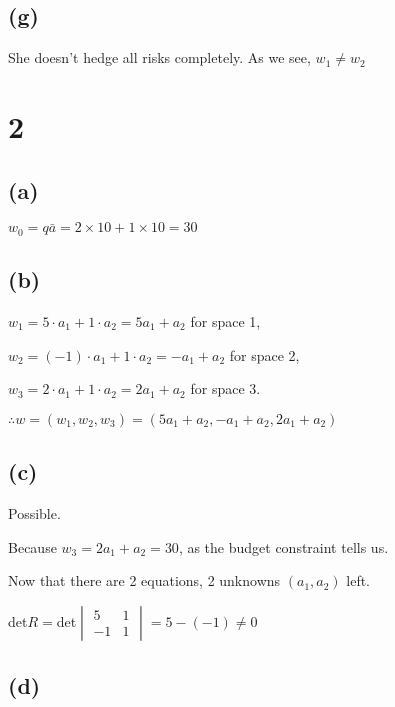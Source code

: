 \documentclass{article}
\begin{document}
\subsection*{(g)}

She doesn't hedge all risks completely. As we see, $w_{1}\not=w_{2}$

\section*{2}

\subsection*{(a)}

$w_{0}=q\bar{a}=2\times10+1\times10=\boxed{30}$

\subsection*{(b)}

$w_{1}=5\cdot a_{1}+1\cdot a_{2}=5a_{1}+a_{2}$ for space 1,

$w_{2}=(-1)\cdot a_{1}+1\cdot a_{2}=-a_{1}+a_{2}$ for space 2,

$w_{3}=2\cdot a_{1}+1\cdot a_{2}=2a_{1}+a_{2}$ for space 3.

$\therefore w=(w_{1}, w_{2}, w_{3})=\boxed{(5a_{1}+a_{2}, -a_{1}+a_{2}, 2a_{1}+a_{2})}$

\newpage

\subsection*{(c)}

Possible. 

Because $w_{3}=2a_{1}+a_{2}=30$, as the budget constraint tells us. 

Now that there are 2 equations, 2 unknowns $(a_{1}, a_{2})$ left.

det$R=$det$\begin{vmatrix}
    5 & 1 \\
    -1 & 1
\end{vmatrix}=5-(-1)\not=0$

\subsection*{(d)}
\end{document}
